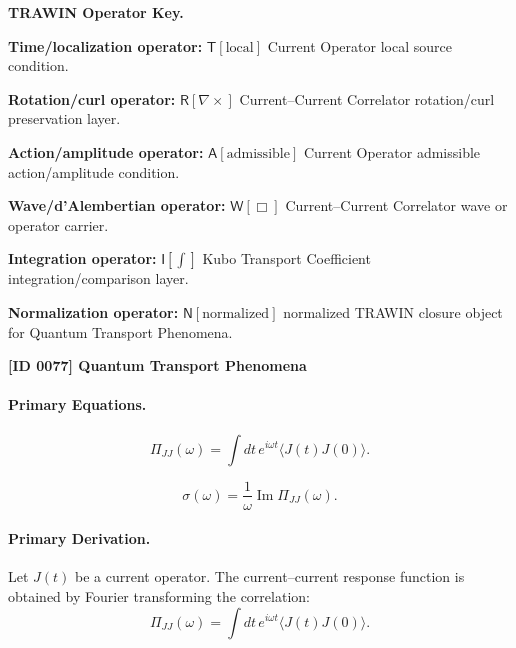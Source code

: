 \par\vspace{0.45\baselineskip}
\noindent\begin{minipage}[t]{\linewidth}
\begingroup
\small
\raggedright
\textbf{TRAWIN Operator Key.}\par
\noindent\textbf{Time/localization operator:} $\mathsf{T}\!\left[\mathrm{local}\right]$ Current Operator local source condition.\par
\noindent\textbf{Rotation/curl operator:} $\mathsf{R}\!\left[\nabla\times\right]$ Current--Current Correlator rotation/curl preservation layer.\par
\noindent\textbf{Action/amplitude operator:} $\mathsf{A}\!\left[\mathrm{admissible}\right]$ Current Operator admissible action/amplitude condition.\par
\noindent\textbf{Wave/d'Alembertian operator:} $\mathsf{W}\!\left[\Box\right]$ Current--Current Correlator wave or operator carrier.\par
\noindent\textbf{Integration operator:} $\mathsf{I}\!\left[\int\right]$ Kubo Transport Coefficient integration/comparison layer.\par
\noindent\textbf{Normalization operator:} $\mathsf{N}\!\left[\mathrm{normalized}\right]$ normalized TRAWIN closure object for Quantum Transport Phenomena.\par
\endgroup
\end{minipage}

\clearpage
\noindent\textbf{[ID 0077] Quantum Transport Phenomena}\par
\vspace{0.35em}
\paragraph{Primary Equations.}
\begin{equation}
\Pi_{JJ}(\omega)
=
\int
dt\,
e^{i\omega t}
\langle J(t)J(0)\rangle .
\end{equation}

\begin{equation}
\sigma(\omega)
=
\frac{1}{\omega}
\operatorname{Im}\Pi_{JJ}(\omega).
\end{equation}

\paragraph{Primary Derivation.}
Let $J(t)$ be a current operator.  
The current--current response function is obtained by Fourier transforming the correlation:
\begin{equation}
\Pi_{JJ}(\omega)
=
\int
dt\,
e^{i\omega t}
\langle J(t)J(0)\rangle .
\end{equation}

